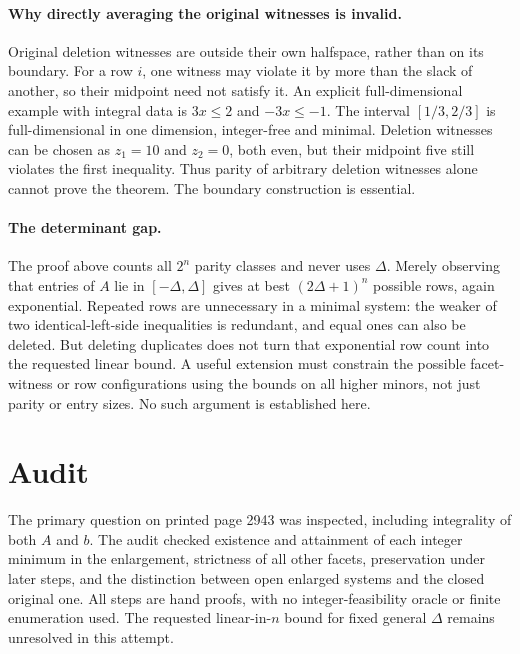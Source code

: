 \documentclass[11pt]{article}
\begin{document}
\paragraph{Why directly averaging the original witnesses is invalid.}
Original deletion witnesses are outside their own halfspace, rather
than on its boundary. For a row $i$, one witness may violate
it by more than the slack of another, so their midpoint need
not satisfy it. An explicit full-dimensional example with integral
data is $3x\le2$ and $-3x\le-1$. The interval
$[1/3,2/3]$ is full-dimensional in one dimension, integer-free
and minimal. Deletion witnesses can be chosen as $z_1=10$ and
$z_2=0$, both even, but their midpoint five still violates the
first inequality. Thus parity of arbitrary deletion witnesses alone cannot
prove the theorem. The boundary construction is essential.

\paragraph{The determinant gap.}
The proof above counts all $2^n$ parity classes and never uses
$\Delta$. Merely observing that entries of $A$ lie in
$[-\Delta,\Delta]$ gives at best $(2\Delta+1)^n$ possible
rows, again exponential. Repeated rows are unnecessary in a minimal
system: the weaker of two identical-left-side inequalities is
redundant, and equal ones can also be deleted. But deleting duplicates
does not turn that exponential row count into the requested linear
bound. A useful extension must constrain the possible facet-witness
or row configurations using the bounds on all higher minors, not
just parity or entry sizes. No such argument is established here.

\section{Audit}
The primary question on printed page 2943 was inspected, including
integrality of both $A$ and $b$. The audit checked existence
and attainment of each integer minimum in the enlargement, strictness
of all other facets, preservation under later steps, and the
distinction between open enlarged systems and the closed original
one. All steps are hand proofs, with no integer-feasibility oracle
or finite enumeration used. The requested linear-in-$n$ bound for
fixed general $\Delta$ remains unresolved in this attempt.
\end{document}
